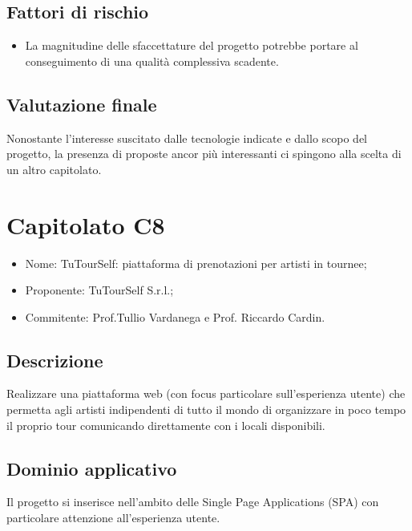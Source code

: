 \documentclass[openany,12pt,a4paper]{report}
\begin{document}
\subsection{Fattori di rischio}

\begin{itemize}
    \item La magnitudine delle sfaccettature del progetto potrebbe portare al conseguimento di una qualità complessiva scadente.
\end{itemize}

\subsection{Valutazione finale}

Nonostante l'interesse suscitato dalle tecnologie indicate e dallo scopo del progetto, la presenza di proposte ancor più interessanti ci spingono alla scelta di un altro capitolato.


\section{Capitolato C8}

\begin{itemize}
    \item{Nome:} TuTourSelf: piattaforma di prenotazioni per artisti in tournee;
    \item{Proponente:} TuTourSelf S.r.l.;
    \item{Commitente:} Prof.Tullio Vardanega e Prof. Riccardo Cardin.
\end{itemize}

\subsection{Descrizione}

Realizzare una piattaforma web (con focus particolare sull'esperienza utente) che permetta agli artisti indipendenti di tutto il mondo di organizzare in poco tempo il proprio tour comunicando direttamente con i locali disponibili.

\subsection{Dominio applicativo}

Il progetto si inserisce nell'ambito delle Single Page Applications (SPA) con particolare attenzione all'esperienza utente.
\end{document}
